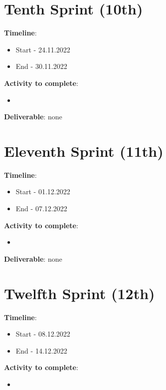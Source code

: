 \section{Tenth Sprint (10th)}
\label{sec:planning_tenth}

\textbf{Timeline}:
\begin{itemize}
    \item Start - 24.11.2022
	\item End - 30.11.2022
\end{itemize}

\textbf{Activity to complete}:
\begin{itemize}
    \item {}
\end{itemize}

\textbf{Deliverable}: none

\section{Eleventh Sprint (11th)}
\label{sec:planning_eleventh}

\textbf{Timeline}:
\begin{itemize}
    \item Start - 01.12.2022
	\item End - 07.12.2022
\end{itemize}

\textbf{Activity to complete}:
\begin{itemize}
    \item {}
\end{itemize}

\textbf{Deliverable}: none

\section{Twelfth Sprint (12th)}
\label{sec:planning_twelfth}

\textbf{Timeline}:
\begin{itemize}
    \item Start - 08.12.2022
	\item End - 14.12.2022
\end{itemize}

\textbf{Activity to complete}:
\begin{itemize}
    \item {}
\end{itemize}

